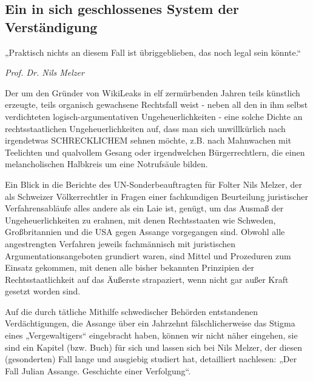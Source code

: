 \begin{multicols}{2}
\chapter{Ein in sich geschlossenes System der Verständigung} %

\epigraph{„Praktisch nichts an diesem Fall ist übriggeblieben, das noch legal sein könnte.“}{\textit{Prof. Dr. Nils Melzer}}

Der um den Gründer von WikiLeaks in elf zermürbenden Jahren teils künstlich erzeugte, teils organisch gewachsene Rechtsfall weist - neben all den in ihm selbst
verdichteten logisch-argumentativen Ungeheuerlichkeiten - eine solche Dichte an rechtsstaatlichen Ungeheuerlichkeiten auf, dass man sich unwillkürlich nach
irgendetwas SCHRECKLICHEM sehnen möchte, z.B.
nach Mahnwachen mit Teelichten und qualvollem Gesang oder irgendwelchen Bürgerrechtlern, die einen melancholischen Halbkreis um eine Notrufsäule bilden.

Ein Blick in die Berichte des UN-Sonderbeauftragten für
Folter Nils Melzer, der als Schweizer Völkerrechtler in
Fragen einer fachkundigen Beurteilung juristischer Verfahrensabläufe alles andere als ein Laie ist, genügt, um
das Ausmaß der Ungeheuerlichkeiten zu erahnen, mit
denen Rechtsstaaten wie Schweden, Großbritannien
und die USA gegen Assange vorgegangen sind. Obwohl
alle angestrengten Verfahren jeweils fachmännisch mit
juristischen Argumentationsangeboten grundiert waren, sind Mittel und Prozeduren zum Einsatz gekommen, mit denen alle bisher bekannten Prinzipien der
Rechtsstaatlichkeit auf das Äußerste strapaziert, wenn
nicht gar außer Kraft gesetzt worden sind.

Auf die durch tätliche Mithilfe schwedischer Behörden
entstandenen Verdächtigungen, die Assange über ein
Jahrzehnt fälschlicherweise das Stigma eines „Vergewaltigers“ eingebracht haben, können wir nicht näher
eingehen, sie sind ein Kapitel (bzw. Buch) für sich und
lassen sich bei Nils Melzer, der diesen (gesonderten) Fall
lange und ausgiebig studiert hat, detailliert nachlesen:
„Der Fall Julian Assange. Geschichte einer Verfolgung“.


\end{multicols}
